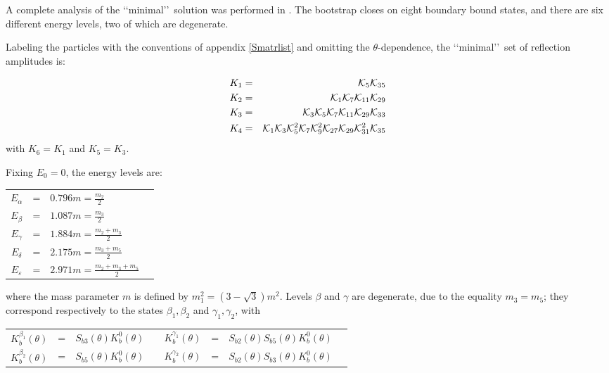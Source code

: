 \documentclass[a4paper,12pt]{report}
\begin{document}
A complete analysis of the \lq\lq minimal\rq\rq \, solution was performed in \cite{fring2}. The bootstrap closes
on eight boundary bound states, and there are six different energy levels, two of which are degenerate.

Labeling the particles with the conventions of appendix \ref{Smatrlist} and omitting the $\theta$-dependence, the
\lq\lq minimal\rq\rq \, set of reflection amplitudes is:

\begin{eqnarray}
\label{min1}K_{1}&=& {\cal K}_{5}{\cal K}_{35}  \\
\label{min2}K_{2}&=& {\cal K}_{1}{\cal K}_{7}{\cal K}_{11} {\cal K}_{29} \\
\label{min3}K_{3}&=& {\cal K}_{3}{\cal K}_{5}{\cal K}_{7}{\cal K}_{11}{\cal K}_{29}{\cal K}_{33} \\
\label{min4}K_{4}&=& {\cal K}_{1}{\cal K}_{3}{\cal K}^{2}_{5}{\cal K}_{7}{\cal K}^{2}_{9}{\cal K}_{27}{\cal
K}_{29} {\cal K}^{2}_{31}{\cal K}_{35}
\end{eqnarray}
with $K_{6}=K_{1}$ and $K_{5}=K_{3}$.

Fixing $E_{0}=0$, the energy levels are:
\begin{center}
\begin{tabular}{cclc|}
$E_{\alpha}$ &=& $0.796 m =\frac{m_{2}}{2}$ \\
$E_{\beta}$ &=& $1.087 m =\frac{m_{3}}{2}$ \\
$E_{\gamma}$ &=& $1.884 m =\frac{m_{2}+m_{3}}{2}$ \\
$E_{\delta}$ &=& $2.175 m =\frac{m_{3}+m_{5}}{2}$ \\
$E_{\varepsilon}$ &=& $2.971 m =\frac{m_{2}+m_{3}+m_{5}}{2}$ \\
\end{tabular}
\end{center}
where the mass parameter $m$ is defined by $m_{1}^{2}=\left(3-\sqrt{3}\right)m^{2}$. Levels $\beta$ and $\gamma$
are degenerate, due to the equality $m_{3}=m_{5}$; they correspond respectively to the states
$\beta_{1},\beta_{2}$ and $\gamma_{1},\gamma_{2}$, with
\begin{center}
\begin{tabular}{cclc|cclc|}
$K_{b}^{\beta_{1}}(\theta)$ &=& $S_{b3}(\theta)K_{b}^{0}(\theta)$ && $K_{b}^{\gamma_{1}}(\theta)$ &=& $S_{b2}(\theta)S_{b5}(\theta)K_{b}^{0}(\theta)$ \\
$K_{b}^{\beta_{2}}(\theta)$ &=& $S_{b5}(\theta)K_{b}^{0}(\theta)$ && $K_{b}^{\gamma_{2}}(\theta)$ &=& $S_{b2}(\theta)S_{b3}(\theta)K_{b}^{0}(\theta)$ \\
\end{tabular}
\end{center}
\end{document}
